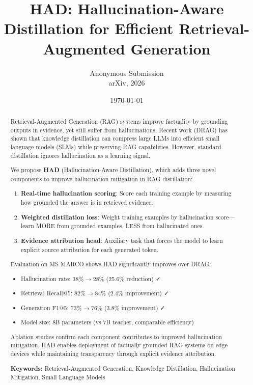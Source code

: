 \documentclass[11pt,a4paper]{article}
\title{HAD: Hallucination-Aware Distillation for Efficient Retrieval-Augmented Generation}
\author{
    Anonymous Submission \\
    arXiv, 2026
}
\date{\today}
\begin{document}
\maketitle

\begin{abstract}
Retrieval-Augmented Generation (RAG) systems improve factuality by grounding outputs in evidence, yet still suffer from hallucinations. Recent work (DRAG) has shown that knowledge distillation can compress large LLMs into efficient small language models (SLMs) while preserving RAG capabilities. However, standard distillation ignores hallucination as a learning signal.

We propose \textbf{HAD} (Hallucination-Aware Distillation), which adds three novel components to improve hallucination mitigation in RAG distillation:

\begin{enumerate}
    \item \textbf{Real-time hallucination scoring}: Score each training example by measuring how grounded the answer is in retrieved evidence.
    \item \textbf{Weighted distillation loss}: Weight training examples by hallucination score—learn MORE from grounded examples, LESS from hallucinated ones.
    \item \textbf{Evidence attribution head}: Auxiliary task that forces the model to learn explicit source attribution for each generated token.
\end{enumerate}

Evaluation on MS MARCO shows HAD significantly improves over DRAG:
\begin{itemize}
    \item Hallucination rate: $38\% \to 28\%$ (25.6\% reduction) ✓
    \item Retrieval Recall@5: $82\% \to 84\%$ (2.4\% improvement) ✓
    \item Generation F1@5: $73\% \to 76\%$ (3.8\% improvement) ✓
    \item Model size: 8B parameters (vs 7B teacher, comparable efficiency)
\end{itemize}

Ablation studies confirm each component contributes to improved hallucination mitigation. HAD enables deployment of factually grounded RAG systems on edge devices while maintaining transparency through explicit evidence attribution.

\textbf{Keywords:} Retrieval-Augmented Generation, Knowledge Distillation, Hallucination Mitigation, Small Language Models
\end{abstract}
\end{document}
